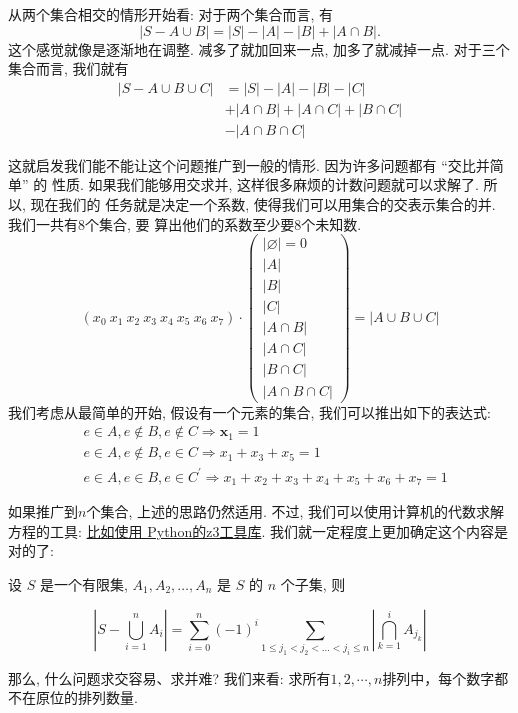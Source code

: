从两个集合相交的情形开始看: 对于两个集合而言, 有
$$|S-A \cup B|=|S|-|A|-|B|+|A \cap B|. $$
这个感觉就像是逐渐地在调整. 减多了就加回来一点, 加多了就减掉一点. 
对于三个集合而言, 我们就有
$$
\begin{aligned}
|S-A \cup B \cup C| &=|S|-|A|-|B|-|C| \\
&+|A \cap B|+|A \cap C|+|B \cap C| \\
&-|A \cap B \cap C| 
\end{aligned}
$$

这就启发我们能不能让这个问题推广到一般的情形. 因为许多问题都有 “交比并简单” 的
性质. 如果我们能够用交求并, 这样很多麻烦的计数问题就可以求解了. 所以, 现在我们的 
任务就是决定一个系数, 使得我们可以用集合的交表示集合的并. 我们一共有8个集合, 要
算出他们的系数至少要8个未知数. 
$$
(x_0\mathrm{~}x_1\mathrm{~}x_2\mathrm{~}x_3\mathrm{~}x_4\mathrm{~}x_5\mathrm{~}x_6\mathrm{~}x_7)\cdot\left(\begin{array}{c}|\varnothing|=0\\|A|\\|B|\\|C|\\|A\cap B|\\|A\cap C|\\|B\cap C|\\|A\cap B\cap C|\end{array}\right)=|A\cup B\cup C|
$$
我们考虑从最简单的开始, 假设有一个元素的集合, 我们可以推出如下的表达式: 
\begin{align*}
    &e\in A,e\notin B,e\notin C \Rightarrow\boldsymbol{x}_1=1  \\
    &e\in A,e\notin B,e\in C \Rightarrow x_1+x_3+x_5=1  \\
    &e\in A,e\in B,e\in C ^{\prime}\Rightarrow x_1+x_2+x_3+x_4+x_5+x_6+x_7=1 
\end{align*}

如果推广到$n$个集合, 上述的思路仍然适用. 不过, 我们可以使用计算机的代数求解
方程的工具: \href{https://jyywiki.cn/OI/counting.slides#/2/5}{比如使用
Python的z3工具库}. 我们就一定程度上更加确定这个内容是对的了: 

\begin{theorem}[容斥原理]
    设  $S$  是一个有限集,  $A_{1}, A_{2}, \ldots, A_{n}$  是  $S$  的  $n$  个子集, 则

$$\left|S-\bigcup_{i=1}^{n} A_{i}\right|=\sum_{i=0}^{n}(-1)^{i} \sum_{1 \leq j_{1}<j_{2}<\ldots<j_{i} \leq n}\left|\bigcap_{k=1}^{i} A_{j_{k}}\right| $$
    
\end{theorem}
那么, 什么问题求交容易、求并难? 我们来看: 求所有$1,2,\cdots ,n$排列中，每个数字都不在原位的排列数量.

